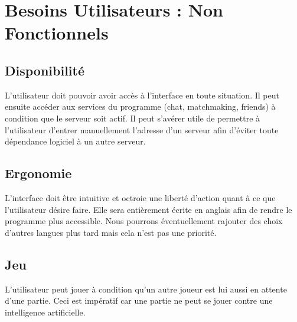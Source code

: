 \section{Besoins Utilisateurs : Non Fonctionnels}
        \subsection{Disponibilité}
                L'utilisateur doit pouvoir avoir accès à l'interface en toute situation. Il peut ensuite accéder aux services du programme (chat, matchmaking, friends) à condition que le serveur soit actif. Il peut s'avérer utile de permettre à l'utilisateur d'entrer manuellement l'adresse d'un serveur afin d'éviter toute dépendance logiciel à un autre serveur.

        \subsection{Ergonomie}
                L'interface doit être intuitive et octroie une liberté d'action quant à ce que l'utilisateur désire faire.
                Elle sera entièrement écrite en anglais afin de rendre le programme plus accessible. Nous pourrons éventuellement rajouter des choix d'autres langues plus tard mais cela n'est pas une priorité.

        \subsection{Jeu}
                L'utilisateur peut jouer à condition qu'un autre joueur est lui aussi en attente d'une partie. Ceci est impératif car une partie ne peut se jouer contre une intelligence artificielle.
